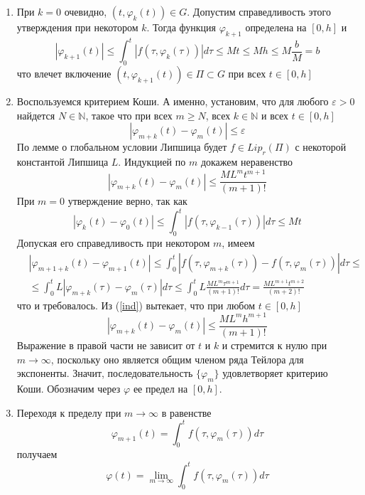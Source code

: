 \begin{enumerate}
    \item При $k = 0$ очевидно, $(t, \varphi_k(t)) \in G$. Допустим справедливость этого утверждения при некотором $k$. Тогда функция $\varphi_{k+1}$ определена на $[0,h]$ и
    \begin{equation*}
        |\varphi_{k+1}(t)| \le \int_0^t |f(\tau, \varphi_k(\tau))|d\tau \le Mt \le Mh \le M\frac{b}{M} = b
    \end{equation*}
    что влечет включение $(t, \varphi_{k+1}(t)) \in \Pi \subset G$ при всех $t \in [0,h]$
    \item Воспользуемся критерием Коши. А именно, установим, что для любого $\varepsilon > 0$ найдется $N \in \mathbb{N}$, такое что при всех $m \ge N$, всех $k \in \mathbb{N}$ и всех $t \in [0,h]$
    \begin{equation*}
        |\varphi_{m+k}(t) - \varphi_m(t)| \le \varepsilon
    \end{equation*}
    По лемме о глобальном условии Липшица будет $f \in Lip_r(\Pi)$ с некоторой константой Липшица $L$. Индукцией по $m$ докажем неравенство
    \begin{equation}
        |\varphi_{m+k}(t) - \varphi_m(t)| \le \frac{ML^mt^{m+1}}{(m+1)!} \label{ind}
    \end{equation}
    При $m = 0$ утверждение верно, так как
    \begin{equation*}
        |\varphi_k(t) - \varphi_0(t)| \le \int_0^t |f(\tau, \varphi_{k-1}(\tau))|d\tau \le Mt
    \end{equation*}
    Допуская его справедливость при некотором $m$, имеем
    \begin{equation*}
        \begin{aligned}
            &|\varphi_{m + 1 + k}(t) - \varphi_{m+1}(t)| \le \int_0^t |f(\tau, \varphi_{m+k}(\tau)) - f(\tau, \varphi_m(\tau))|d\tau \le \\
            &\le \int_0^t L|\varphi_{m+k}(\tau) - \varphi_m(\tau)|d\tau \le \int_0^t L\frac{ML^m\tau^{m+1}}{(m+1)!}d\tau = \frac{ML^{m+1}t^{m+2}}{(m+2)!}
        \end{aligned}
    \end{equation*}
    что и требовалось. Из (\ref{ind}) вытекает, что при любом $t \in [0,h]$
    \begin{equation}
        |\varphi_{m+k}(t) - \varphi_m(t)| \le \frac{ML^mh^{m+1}}{(m+1)!} \label{indh}
    \end{equation}
    Выражение в правой части не зависит от $t$ и $k$ и стремится к нулю при $m \to \infty$, поскольку оно является общим членом ряда Тейлора для экспоненты. Значит, последовательность $\{\varphi_m\}$ удовлетворяет критерию Коши. Обозначим через $\varphi$ ее предел на $[0,h]$.
    \item Переходя к пределу при $m \to \infty$ в равенстве
    \begin{equation*}
        \varphi_{m+1}(t) = \int_0^t f(\tau, \varphi_m(\tau))d\tau
    \end{equation*}
    получаем
    \begin{equation}
        \varphi(t) = \lim_{m \to \infty} \int_0^t f(\tau, \varphi_m(\tau))d\tau \label{lim}
    \end{equation}
    

\end{enumerate}
